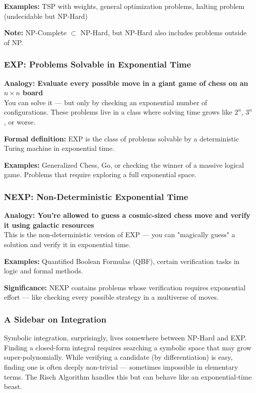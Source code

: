 \textbf{Examples:} TSP with weights, general optimization problems, halting problem (undecidable but NP-Hard)

\textbf{Note:} NP-Complete $\subset$ NP-Hard, but NP-Hard also includes problems outside of NP.

\subsubsection{EXP: Problems Solvable in Exponential Time}

\textbf{Analogy: Evaluate every possible move in a giant game of chess on an $n \times n$ board} \\
You can solve it — but only by checking an exponential number of configurations. These problems live in a class where solving time grows like $2^n$, $3^n$, or worse.

\textbf{Formal definition:} EXP is the class of problems solvable by a deterministic Turing machine in exponential time.

\textbf{Examples:} Generalized Chess, Go, or checking the winner of a massive logical game. Problems that require exploring a full exponential space.

\subsubsection{NEXP: Non-Deterministic Exponential Time}

\textbf{Analogy: You're allowed to guess a cosmic-sized chess move and verify it using galactic resources} \\
This is the non-deterministic version of EXP — you can "magically guess" a solution and verify it in exponential time.

\textbf{Examples:} Quantified Boolean Formulas (QBF), certain verification tasks in logic and formal methods.

\textbf{Significance:} NEXP contains problems whose verification requires exponential effort — like checking every possible strategy in a multiverse of moves.

\subsubsection{A Sidebar on Integration}

Symbolic integration, surprisingly, lives somewhere between NP-Hard and EXP. Finding a closed-form integral requires searching a symbolic space that may grow super-polynomially. While verifying a candidate (by differentiation) is easy, finding one is often deeply non-trivial — sometimes impossible in elementary terms. The Risch Algorithm handles this but can behave like an exponential-time beast.

